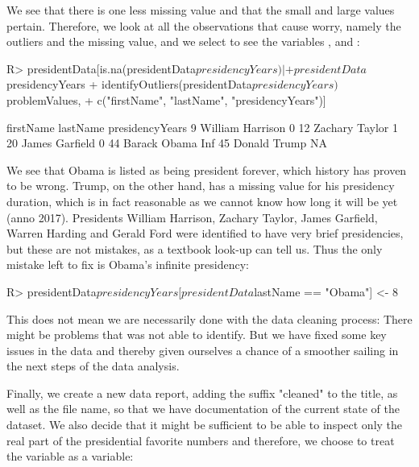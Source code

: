 \documentclass[article,shortnames]{jss}
\begin{document}
We see that there is one less missing value and that the small and large values pertain. Therefore, we look at all the observations that cause worry, namely the outliers and the missing value, and we select to see the variables ,  and :

\begin{Schunk}
\begin{Sinput}
R> presidentData[is.na(presidentData$presidencyYears) | 
+     presidentData$presidencyYears %
+     identifyOutliers(presidentData$presidencyYears)$problemValues, 
+     c("firstName", "lastName", "presidencyYears")]
\end{Sinput}
\begin{Soutput}
   firstName lastName presidencyYears
9    William Harrison               0
12   Zachary   Taylor               1
20     James Garfield               0
44    Barack    Obama             Inf
45    Donald    Trump              NA
\end{Soutput}
\end{Schunk}

We see that Obama is listed as being president forever, which history has proven to be wrong. Trump, on the other hand, has a missing value for his presidency duration, which is in fact reasonable as we cannot know how long it will be yet (anno 2017). Presidents William Harrison, Zachary Taylor, James Garfield, Warren Harding and Gerald Ford were identified to have very brief presidencies, but these are not mistakes, as a textbook look-up can tell us. Thus the only mistake left to fix is Obama's infinite presidency:


\begin{Schunk}
\begin{Sinput}
R> presidentData$presidencyYears[presidentData$lastName == "Obama"] <- 8
\end{Sinput}
\end{Schunk}

This does not mean we are necessarily done with the data cleaning process: There might be problems that  was not able to identify. But we have fixed some key issues in the data and thereby given ourselves a chance of a smoother sailing in the next steps of the data analysis. 

Finally, we create a new data report, adding the suffix "cleaned" to the title, as well as the file name, so that we have documentation of the current state of the dataset. We also decide that it might be sufficient to be able to inspect only the real part of the presidential favorite numbers and therefore, we choose to treat the  variable  as a  variable:
\end{document}
